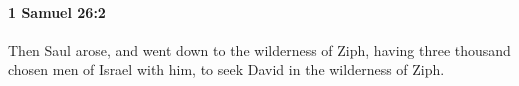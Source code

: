 
		\paragraph{1 Samuel 26:2} %
			\label{1SAMUEL-26-2}

			Then Saul arose, and went down to the wilderness of Ziph, having three thousand chosen men of Israel with him, to seek David in the wilderness of Ziph.


